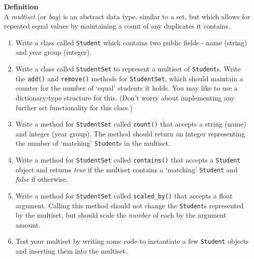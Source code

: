 \documentclass[11pt,a4paper]{report}
\begin{document}
\noindent \textbf{Definition}\\
\noindent A \textit{multiset} (or \textit{bag}) is an abstract data type, similar to a set, but which allows for repeated equal values by maintaining a count of any duplicates it contains.

\vskip20pt

\begin{enumerate}[start=14]
    
    \item Write a class called \texttt{Student} which contains two public fields - name (string) and year group (integer).
    
    \item Write a class called \texttt{StudentSet} to represent a multiset of \texttt{Student}s. Write the \texttt{add()} and \texttt{remove()} methods for \texttt{StudentSet}, which should maintain a counter for the number of `equal' students it holds. You may like to use a dictionary-type structure for this. (Don't worry about implementing any further set functionality for this class.)

    \item Write a method for \texttt{StudentSet} called \texttt{count()} that accepts a string (name) and integer (year group). The method should return an integer representing the number of `matching' \texttt{Student}s in the multiset.

    \item Write a method for \texttt{StudentSet} called \texttt{contains()} that accepts a \texttt{Student} object and returns \textit{true} if the multiset contains a `matching' \texttt{Student} and \textit{false} if otherwise.

    \item Write a method for \texttt{StudentSet} called \texttt{scaled\_by()} that accepts a float argument. Calling this method should not change the \texttt{Student}s represented by the multiset, but should scale the \textit{number} of each by the argument amount.

    \item Test your multiset by writing some code to instantiate a few \texttt{Student} objects and inserting them into the multiset.

\end{enumerate}
\end{document}
